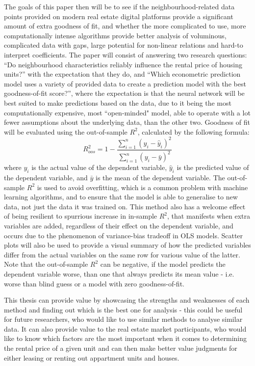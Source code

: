 \documentclass[12pt]{report}
\begin{document}
The goals of this paper then will be to see if the neighbourhood-related data points provided on modern real estate digital platforms provide a significant amount of extra goodness of fit, and whether the more complicated to use, more computationally intense algorithms provide better analysis of voluminous, complicated data with gaps, large potential for non-linear relations and hard-to interpret coefficients. The paper will consist of answering two research questions: “Do neighbourhood characteristics reliably influence the rental price of housing units?”  with the expectation that they do, and “Which econometric prediction model uses a variety of provided data to create a prediction model with the best goodness-of-fit score?”, where the expectation is that the neural network will be best suited to make predictions based on the data, due to it being the most computationally expensive, most ``open-minded" model, able to operate with a lot fewer assumptions about the underlying data, than the other two. Goodness of fit will be evaluated using the out-of-sample $R^2$, calculated by the following formula:
\begin{equation}
	R^2_{oos} = 1 - \frac{\sum_{i=1}^{n}(y_i - \hat{y}_i)^2}{\sum_{i=1}^{n}(y_i - \bar{y})^2}
\end{equation}
where $y_i$ is the actual value of the dependent variable, $\hat{y}_i$ is the predicted value of the dependent variable, and $\bar{y}$ is the mean of the dependent variable. The out-of-sample $R^2$ is used to avoid overfitting, which is a common problem with machine learning algorithms, and to ensure that the model is able to generalise to new data, not just the data it was trained on. This method also has a welcome effect of being resilient to spurrious increase in in-sample $R^2$, that manifests when extra variables are added, regardless of their effect on the dependent variable, and occurs due to the phenomenon of variance-bias tradeoff in OLS models. Scatter plots will also be used to provide a visual summary of how the predicted variables differ from the actual variables on the same row for various value of the latter. Note that the out-of-sample $R^2$ can be negative, if the model predicts the dependent variable worse, than one that always predicts its mean value - i.e. worse than blind guess or a model with zero goodness-of-fit.

This thesis can provide value by showcasing the strengths and weaknesses of each method and finding out which is the best one for analysis - this could be useful for future researchers, who would like to use similar methods to analyse similar data. It can also provide value to the real estate market participants, who would like to know which factors are the most important when it comes to determining the rental price of a given unit and can then make better value judgments for either leasing or renting out appartment units and houses.
\end{document}
